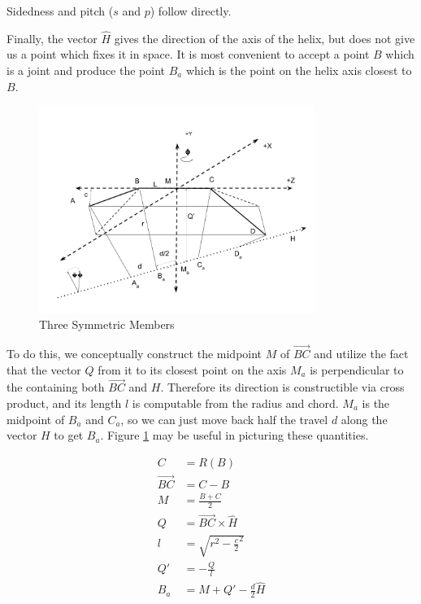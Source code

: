 \documentclass[11pt]{article}
\begin{document}
{Sidedness and pitch ($s$ and $p$) follow directly.

Finally, the vector $\hat{H}$ gives the direction of the
axis of the helix, but does not give us a point which fixes
it in space. It is most convenient to accept a point $B$
which is a joint and produce the point $B_a$ which is the
point on the helix axis closest to $B$.

\begin{figure}
     \centering
     \includegraphics[width=0.80\textwidth]{figures/ThreeMemberDiagram.png}
     \caption{Three Symmetric Members}
  \label{fig:threemembersdiagram}
\end{figure}


To do this, we conceptually construct the midpoint $M$
of $\overrightarrow{BC}$ and utilize the fact that the vector $Q$
from it to its closest point on the axis $M_a$ is perpendicular
to the containing both $\overrightarrow{BC}$ and $H$. Therefore
its direction is constructible via cross product, and
its length $l$ is computable from the radius and chord. $M_a$
is the midpoint of $B_a$ and $C_a$, so we can just move back
half the travel $d$ along the vector $H$ to get $B_a$. Figure \ref{fig:threemembersdiagram}
may be useful in picturing these quantities.

\begin{align}
  C &= R(B) \\
  \overrightarrow{BC} &= C - B\\
  M &= \frac{B + C}{2} \\
  Q &= \overrightarrow{BC} \times \hat{H} \\
  l &= \sqrt{r^2 - \frac{c}{2}^2} \\
  Q' &= -\frac{Q}{l} \\
  B_a &= M + Q' - \frac{d}{2}\hat{H}
\end{align}

}
\end{document}
